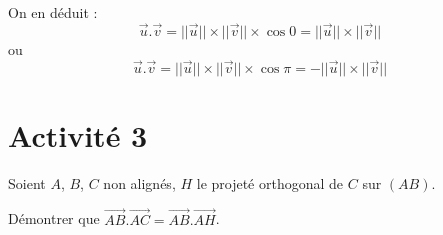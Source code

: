 \documentclass[12pt]{article}
\begin{document}
On en déduit :
\[
\overrightarrow{u}.\overrightarrow{v} = ||\overrightarrow{u}|| \times ||\overrightarrow{v}|| \times \cos 0 = ||\overrightarrow{u}|| \times ||\overrightarrow{v}||
\]
ou
\[
\overrightarrow{u}.\overrightarrow{v} = ||\overrightarrow{u}|| \times ||\overrightarrow{v}|| \times \cos \pi = - ||\overrightarrow{u}|| \times ||\overrightarrow{v}||
\]

\section{Activité 3}

Soient $A$, $B$, $C$ non alignés, $H$ le projeté orthogonal de $C$ sur $(AB)$.

Démontrer que $\overrightarrow{AB}.\overrightarrow{AC} = \overrightarrow{AB}.\overrightarrow{AH}$.
\end{document}

